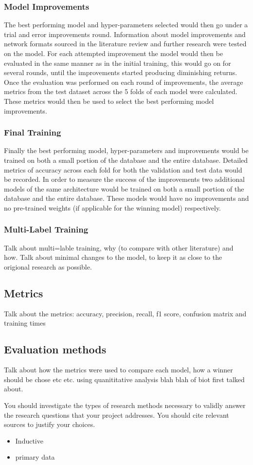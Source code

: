 \subsubsection{Model Improvements}
The best performing model and hyper-parameters selected would then go under a trial and error improvements round. Information about model improvements and network formats sourced in the literature review and further research were tested on the model. For each attempted improvement the model would then be evaluated in the same manner as in the initial training, this would go on for several rounds, until the improvements started producing diminishing returns. Once the evaluation was performed on each round of improvements, the average metrics from the test dataset across the 5 folds of each model were calculated. These metrics would then be used to select the best performing model improvements.

\subsubsection{Final Training}
Finally the best performing model, hyper-parameters and improvements would be trained on both a small portion of the database and the entire database. Detailed metrics of accuracy across each fold for both the validation and test data would be recorded. In order to measure the success of the improvements two additional models of the same architecture would be trained on both a small portion of the database and the entire database. These models would have no improvements and no pre-trained weights (if applicable for the winning model) respectively.

\subsubsection{Multi-Label Training}
Talk about multi=lable training, why (to compare with other literature) and how. Talk about minimal changes to the model, to keep it as close to the origional research as possible.

\subsection{Metrics}
Talk about the metrics: accuracy, precision, recall, f1 score, confusion matrix and training times 

\subsection{Evaluation methods}
Talk  about how the metrics were used to compare each model, how a winner should be chose etc etc. using quanititative analysis blah blah of biot first talked about.




You should investigate the types of research methods necessary to validly answer the research questions that your project addresses. You should cite relevant sources to justify your choices.
\begin{itemize}
    \item Inductive
    \item primary data
    
\end{itemize}